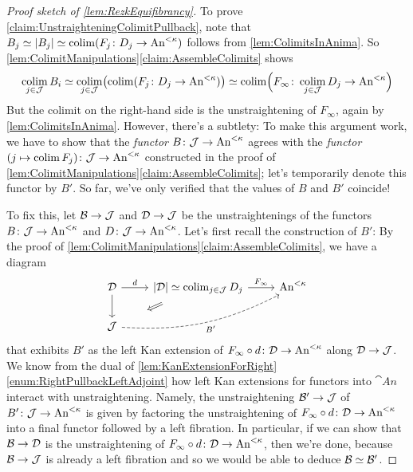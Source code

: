 \begin{proof}[Proof sketch of \cref{lem:RezkEquifibrancy}]
	To prove \cref{claim:UnstraighteningColimitPullback}, note that $B_j\simeq \left|B_j\right|\simeq \colimit (F_j\colon D_j\rightarrow \cat{An}^{<\kappa})$ follows from \cref{lem:ColimitsInAnima}. So \cref{lem:ColimitManipulations}\cref{claim:AssembleColimits} shows
	\begin{equation*}
		\colimit_{j\in\Jj}B_i\simeq \colimit_{j\in\Jj}\left(\colimit(F_j\colon D_j\rightarrow \cat{An}^{<\kappa})\right)\simeq \colimit\Bigl(F_\infty\colon \colimit_{j\in\Jj}D_j\rightarrow\cat{An}^{<\kappa}\Bigr)
	\end{equation*}
	But the colimit on the right-hand side is the unstraightening of $F_\infty$, again by \cref{lem:ColimitsInAnima}. However, there's a subtlety: To make this argument work, we have to show that the \emph{functor} $B\colon \mathcal{J}\rightarrow \mathrm{An}^{<\kappa}$ agrees with the \emph{functor} $(j\mapsto \operatorname*{colim} F_j)\colon \mathcal{J}\rightarrow\mathrm{An}^{<\kappa}$ constructed in the proof of \cref{lem:ColimitManipulations}\cref{claim:AssembleColimits}; let's temporarily denote this functor by $B'$. So far, we've only verified that the values of $B$ and $B'$ coincide! 
	
	To fix this, let $\mathcal{B}\rightarrow \mathcal{J}$ and $\mathcal{D}\rightarrow \mathcal{J}$ be the unstraightenings of the functors $B\colon \mathcal{J}\rightarrow \mathrm{An}^{<\kappa}$ and $D\colon \mathcal{J}\rightarrow \mathrm{An}^{<\kappa}$. Let's first recall the construction of $B'$: By the proof of \cref{lem:ColimitManipulations}\cref{claim:AssembleColimits}, we have a diagram
	\begin{equation*}
		\begin{tikzcd}
			\Dd\rar["d"]\dar &\left|\Dd\right|\simeq \colimit_{j\in\Jj}D_j\rar["F_\infty"]\dlar[phantom,start anchor=center,end anchor=center,"\Longleftarrow"{sloped,pos=0.5}] & \cat{An}^{<\kappa}\\
			\Jj\ar[urr,bend right=15,dashed,"B'"'] & & 
		\end{tikzcd}
	\end{equation*}
	that exhibits $B'$ as the left Kan extension of $F_\infty\circ d\colon \mathcal{D}\rightarrow \mathrm{An}^{<\kappa}$ along $\mathcal{D}\rightarrow \mathcal{J}$. We know from the dual of \cref{lem:KanExtensionForRight}\cref{enum:RightPullbackLeftAdjoint} how left Kan extensions for functors into $\cat{An}$ interact with unstraightening. Namely, the unstraightening $\mathcal{B}'\rightarrow \mathcal{J}$ of $B'\colon \mathcal{J}\rightarrow \mathrm{An}^{<\kappa}$ is given by factoring the unstraightening of $F_\infty\circ d\colon \mathcal{D}\rightarrow \mathrm{An}^{<\kappa}$ into a final functor followed by a left fibration. In particular, if we can show that $\mathcal{B}\rightarrow\mathcal{D}$ is the unstraightening of $F_\infty\circ d\colon \mathcal{D}\rightarrow \mathrm{An}^{<\kappa}$, then we're done, because $\mathcal{B}\rightarrow\mathcal{J}$ is already a left fibration and so we would be able to deduce $\mathcal{B}\simeq \mathcal{B}'$.
	

\end{proof}
